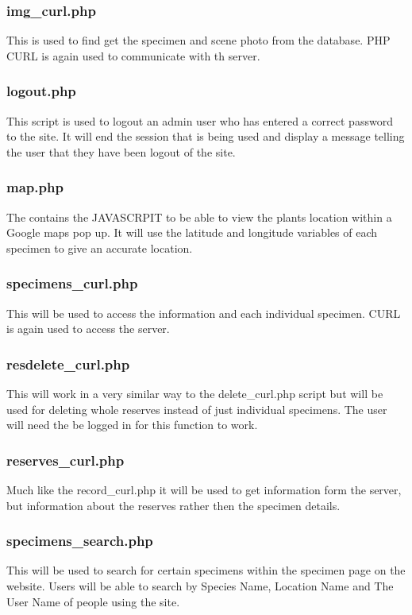 \begin{itemize}
	\subsubsection{img\_curl.php}
		This is used to find get the specimen and scene photo from the database. PHP CURL is again used to communicate with th server.

	\subsubsection{logout.php}
		This script is used to logout an admin user who has entered a correct password to the site. It will end the session that is being used and display a message telling the user that they have been logout of the site.

	\subsubsection{map.php}
		The contains the JAVASCRPIT to be able to view the plants location within a Google maps pop up. It will use the latitude and longitude variables of each specimen to give an accurate location.

	\subsubsection{specimens\_curl.php}
		This will be used to access the information and each individual specimen. CURL is again used to access the server.

	\subsubsection{resdelete\_curl.php}
		This will work in a very similar way to the delete\_curl.php script but will be used for deleting whole reserves instead of just individual specimens. The user will need the be logged in for this function to work. 

	\subsubsection{reserves\_curl.php}
		Much like the record\_curl.php it will be used to get information form the server, but information about the reserves rather then the specimen details.

	\subsubsection{specimens\_search.php}
		This will be used to search for certain specimens within the specimen page on the website. Users will be able to search by Species Name, Location Name and The User Name of people using the site.


\end{itemize}
